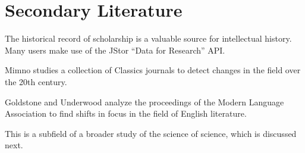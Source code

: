 \section{Secondary Literature}

The historical record of scholarship is a valuable source for intellectual history. Many users make use of the JStor ``Data for Research'' API.

Mimno \cite{Mimno-12b} studies a collection of Classics journals to detect changes in the field over the 20th century.

Goldstone and Underwood \cite{Goldstone-14} analyze the proceedings of the Modern Language Association to find shifts in focus in the field of English literature.

This is a subfield of a broader study of the science of science, which is discussed next.